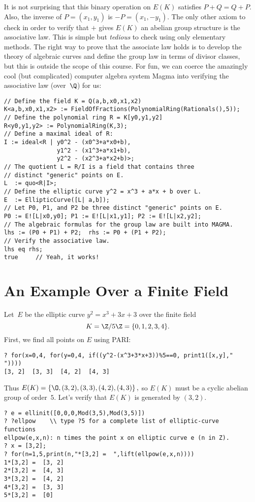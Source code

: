 \documentclass[11pt]{report}
\begin{document}
It is not surprising that this binary operation on $E(K)$
satisfies $P+Q = Q+P$.  Also, the inverse of $P=(x_1,y_1)$ is
$-P=(x_1,-y_1)$.  The only other axiom to check in order to
verify that $+$ gives $E(K)$ an abelian group structure is the associative
law.  This is simple but {\em tedious} to check using only elementary
methods.  The right way to prove that the associate law holds is to
develop the theory of algebraic curves and define the group law in
terms of divisor classes, but this is outside the scope of this course.
For fun, we can coerce the amazingly cool (but complicated)
computer algebra system {\sc Magma} into verifying
the associative law (over~$\Q$) for us:
\begin{verbatim}
// Define the field K = Q(a,b,x0,x1,x2) 
K<a,b,x0,x1,x2> := FieldOfFractions(PolynomialRing(Rationals(),5));
// Define the polynomial ring R = K[y0,y1,y2]
R<y0,y1,y2> := PolynomialRing(K,3);
// Define a maximal ideal of R:
I := ideal<R | y0^2 - (x0^3+a*x0+b), 
               y1^2 - (x1^3+a*x1+b), 
               y2^2 - (x2^3+a*x2+b)>;
// The quotient L = R/I is a field that contains three 
// distinct "generic" points on E.
L  := quo<R|I>;
// Define the elliptic curve y^2 = x^3 + a*x + b over L.
E  := EllipticCurve([L| a,b]);  
// Let P0, P1, and P2 be three distinct "generic" points on E.
P0 := E![L|x0,y0]; P1 := E![L|x1,y1]; P2 := E![L|x2,y2];
// The algebraic formulas for the group law are built into MAGMA.
lhs := (P0 + P1) + P2;  rhs := P0 + (P1 + P2);
// Verify the associative law.
lhs eq rhs;
true     // Yeah, it works!
\end{verbatim}

\section{An Example Over a Finite Field}
Let~$E$ be the elliptic curve $y^2 = x^3 + 3x + 3$ over the finite
field
$$
  K=\Z/5\Z = \{0, 1, 2, 3, 4\}.
$$
First, we find all points on $E$ using PARI:
\begin{verbatim}
? for(x=0,4, for(y=0,4, if((y^2-(x^3+3*x+3))%5==0, print1([x,y],"  "))))
[3, 2]  [3, 3]  [4, 2]  [4, 3]
\end{verbatim}
Thus
$
  E(K) = \left\{\O, (3,2), (3,3), (4,2), (4,3)\right\},
$
so $E(K)$ must be a cyclic abelian group of order~$5$.
Let's verify that $E(K)$ is generated by $(3,2)$.
\begin{verbatim}
? e = ellinit([0,0,0,Mod(3,5),Mod(3,5)])
? ?ellpow    \\ type ?5 for a complete list of elliptic-curve functions
ellpow(e,x,n): n times the point x on elliptic curve e (n in Z).
? x = [3,2];
? for(n=1,5,print(n,"*[3,2] =  ",lift(ellpow(e,x,n))))
1*[3,2] =  [3, 2]
2*[3,2] =  [4, 3]
3*[3,2] =  [4, 2]
4*[3,2] =  [3, 3]
5*[3,2] =  [0]
\end{verbatim}
\end{document}
